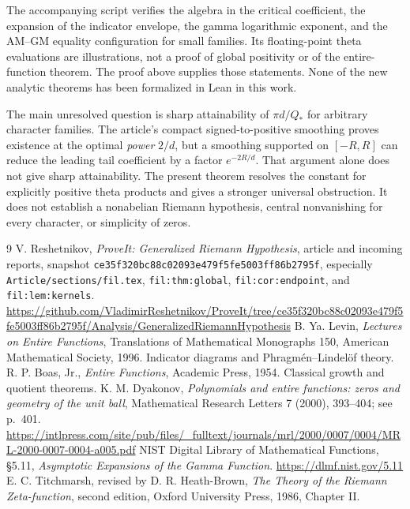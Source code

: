 \documentclass[11pt]{article}
\theoremstyle{remark}\newtheorem{remark}[theorem]{Remark}
\begin{document}
The accompanying script verifies the algebra in the critical coefficient, the expansion of the indicator envelope, the gamma logarithmic exponent, and the AM--GM equality configuration for small families. Its floating-point theta evaluations are illustrations, not a proof of global positivity or of the entire-function theorem. The proof above supplies those statements. None of the new analytic theorems has been formalized in Lean in this work.

The main unresolved question is sharp attainability of $\pi d/Q_*$ for arbitrary character families. The article's compact signed-to-positive smoothing proves existence at the optimal \emph{power} $2/d$, but a smoothing supported on $[-R,R]$ can reduce the leading tail coefficient by a factor $e^{-2R/d}$. That argument alone does not give sharp attainability. The present theorem resolves the constant for explicitly positive theta products and gives a stronger universal obstruction. It does not establish a nonabelian Riemann hypothesis, central nonvanishing for every character, or simplicity of zeros.

\begin{thebibliography}{9}
 V. Reshetnikov, \emph{ProveIt: Generalized Riemann Hypothesis}, article and incoming reports, snapshot \texttt{ce35f320bc88c02093e479f5fe5003ff86b2795f}, especially \texttt{Article/sections/fil.tex}, \texttt{fil:thm:global}, \texttt{fil:cor:endpoint}, and \texttt{fil:lem:kernels}. \url{https://github.com/VladimirReshetnikov/ProveIt/tree/ce35f320bc88c02093e479f5fe5003ff86b2795f/Analysis/GeneralizedRiemannHypothesis}
 B. Ya. Levin, \emph{Lectures on Entire Functions}, Translations of Mathematical Monographs 150, American Mathematical Society, 1996. Indicator diagrams and Phragm\'en--Lindel\"of theory.
 R. P. Boas, Jr., \emph{Entire Functions}, Academic Press, 1954. Classical growth and quotient theorems.
 K. M. Dyakonov, \emph{Polynomials and entire functions: zeros and geometry of the unit ball}, Mathematical Research Letters 7 (2000), 393--404; see p.~401. \url{https://intlpress.com/site/pub/files/_fulltext/journals/mrl/2000/0007/0004/MRL-2000-0007-0004-a005.pdf}
 NIST Digital Library of Mathematical Functions, \S5.11, \emph{Asymptotic Expansions of the Gamma Function}. \url{https://dlmf.nist.gov/5.11}
 E. C. Titchmarsh, revised by D. R. Heath-Brown, \emph{The Theory of the Riemann Zeta-function}, second edition, Oxford University Press, 1986, Chapter II.
\end{thebibliography}
\end{document}
